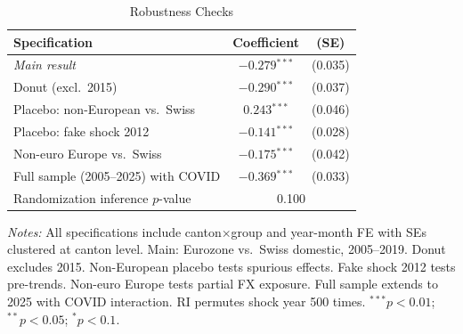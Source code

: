 \begin{table}[t]
\begin{threeparttable}
\centering
\caption{Robustness Checks}
\label{tab:robust}
\begin{tabular}{lcc}
\toprule
Specification & Coefficient & (SE) \\
\midrule
\textit{Main result} & $-0.279$$^{***}$ & (0.035) \\
\midrule
Donut (excl.\ 2015) & $-0.290$$^{***}$ & (0.037) \\
Placebo: non-European vs.\ Swiss & $0.243$$^{***}$ & (0.046) \\
Placebo: fake shock 2012 & $-0.141$$^{***}$ & (0.028) \\
Non-euro Europe vs.\ Swiss & $-0.175$$^{***}$ & (0.042) \\
Full sample (2005--2025) with COVID & $-0.369$$^{***}$ & (0.033) \\
Randomization inference $p$-value & \multicolumn{2}{c}{0.100} \\
\bottomrule
\end{tabular}
\begin{tablenotes}
\small
\item \textit{Notes:} All specifications include canton$\times$group and year-month FE with SEs clustered at canton level. Main: Eurozone vs.\ Swiss domestic, 2005--2019. Donut excludes 2015. Non-European placebo tests spurious effects. Fake shock 2012 tests pre-trends. Non-euro Europe tests partial FX exposure. Full sample extends to 2025 with COVID interaction. RI permutes shock year 500 times. $^{***}p<0.01$; $^{**}p<0.05$; $^{*}p<0.1$.
\end{tablenotes}
\end{threeparttable}
\end{table}
